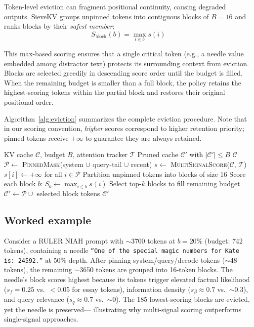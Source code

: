\documentclass[runningheads]{llncs}
\begin{document}
Token-level eviction can fragment positional continuity, causing degraded
outputs.
SieveKV groups unpinned tokens into contiguous blocks of $B{=}16$
and ranks blocks by their \emph{safest member}:
\begin{equation}
  S_{\text{block}}(b) = \max_{i \in b} s(i)
\end{equation}

This max-based scoring ensures that a single critical token (e.g., a
needle value embedded among distractor text) protects its surrounding
context from eviction.
Blocks are selected greedily in descending score order until the budget
is filled.
When the remaining budget is smaller than a full block, the policy
retains the highest-scoring tokens within the partial block and restores
their original positional order.

Algorithm~\ref{alg:eviction} summarizes the complete eviction procedure.
Note that in our scoring convention, \emph{higher} scores correspond to higher retention priority; pinned tokens receive $+\infty$ to guarantee they are always retained.

\begin{algorithm}[t]
\caption{SieveKV eviction at each decode step}
\label{alg:eviction}
\begin{algorithmic}[1]
\REQUIRE KV cache $\mathcal{C}$, budget $B$, attention tracker $\mathcal{T}$
\ENSURE Pruned cache $\mathcal{C}'$ with $|\mathcal{C}'| \leq B$
  \RETURN $\mathcal{C}$ 
\ENDIF
\STATE $\mathcal{P} \leftarrow$ \textsc{PinnedMask}(system $\cup$ query-tail $\cup$ recent)
\STATE $s \leftarrow$ \textsc{MultiSignalScore}($\mathcal{C}$, $\mathcal{T}$)
\STATE $s[i] \leftarrow +\infty$ for all $i \in \mathcal{P}$ 
\STATE Partition unpinned tokens into blocks of size 16
\STATE Score each block $b$: $S_b \leftarrow \max_{i \in b} s(i)$
\STATE Select top-$k$ blocks to fill remaining budget
\STATE $\mathcal{C}' \leftarrow \mathcal{P} \cup$ selected block tokens
\RETURN $\mathcal{C}'$
\end{algorithmic}
\end{algorithm}

\subsection{Worked example}
\label{sec:walkthrough}

Consider a RULER NIAH prompt with ${\sim}$3700 tokens at $b{=}20\%$
(budget: 742 tokens), containing a needle
\texttt{``One of the special magic numbers for Kate is: 24592.''}
at 50\% depth.
After pinning system/query/decode tokens (${\sim}$48 tokens), the
remaining ${\sim}$3650 tokens are grouped into 16-token blocks.
The needle's block scores highest because its tokens trigger elevated
factual likelihood ($s_f{=}0.25$ vs.\ $<$0.05 for essay tokens),
information density ($s_\beta{\approx}0.7$ vs.\ ${\sim}0.3$), and
query relevance ($s_q{\approx}0.7$ vs.\ ${\sim}0$).
The 185 lowest-scoring blocks are evicted, yet the needle is preserved---
illustrating why multi-signal scoring outperforms single-signal approaches.
\end{document}
